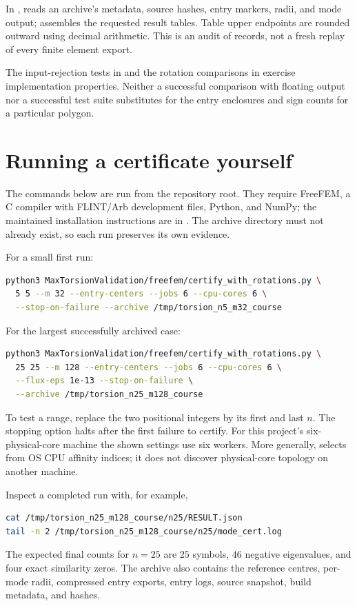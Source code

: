 In ,  reads an
archive's metadata, source hashes, entry markers, radii, and mode output;
 assembles the requested result tables. Table upper endpoints
are rounded outward using decimal arithmetic. This is an audit of records,
not a fresh replay of every finite element export.

The input-rejection tests in  and
the rotation comparisons in
 exercise implementation
properties. Neither a successful comparison with floating output nor a
successful test suite substitutes for the entry enclosures and sign counts
for a particular polygon.

\section{Running a certificate yourself}
The commands below are run from the repository root. They require
FreeFEM, a C compiler with FLINT/Arb development files, Python, and NumPy;
the maintained installation instructions are in
. The archive directory must not
already exist, so each run preserves its own evidence.

For a small first run:
\begin{lstlisting}[language=bash]
python3 MaxTorsionValidation/freefem/certify_with_rotations.py \
  5 5 --m 32 --entry-centers --jobs 6 --cpu-cores 6 \
  --stop-on-failure --archive /tmp/torsion_n5_m32_course
\end{lstlisting}
For the largest successfully archived case:
\begin{lstlisting}[language=bash]
python3 MaxTorsionValidation/freefem/certify_with_rotations.py \
  25 25 --m 128 --entry-centers --jobs 6 --cpu-cores 6 \
  --flux-eps 1e-13 --stop-on-failure \
  --archive /tmp/torsion_n25_m128_course
\end{lstlisting}
To test a range, replace the two positional integers by its first and
last $n$. The stopping option halts after the first failure to certify.
For this project's six-physical-core machine the shown settings use six
workers. More generally,  selects from OS CPU affinity
indices; it does not discover physical-core topology on another machine.

Inspect a completed run with, for example,
\begin{lstlisting}[language=bash]
cat /tmp/torsion_n25_m128_course/n25/RESULT.json
tail -n 2 /tmp/torsion_n25_m128_course/n25/mode_cert.log
\end{lstlisting}
The expected final counts for $n=25$ are $25$ symbols, $46$ negative
eigenvalues, and four exact similarity zeros. The archive also contains
the reference centres, per-mode radii, compressed entry exports, entry
logs, source snapshot, build metadata, and hashes.

